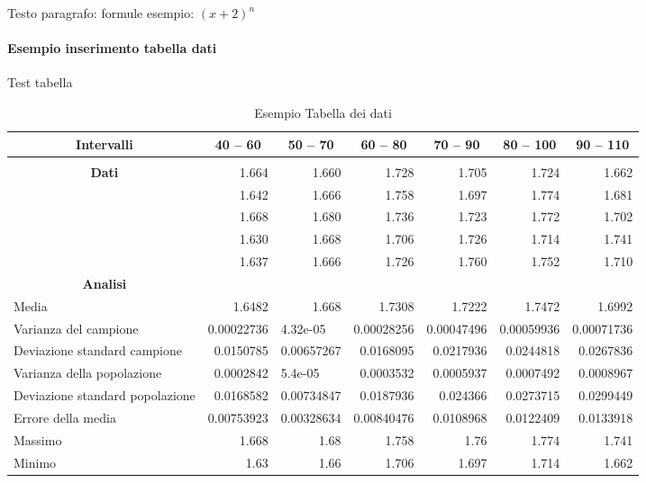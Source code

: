 \documentclass[12pt]{article} %
\begin{document}
	Testo paragrafo: formule %
	esempio: \((x+2)^n\)


\paragraph{Esempio inserimento tabella dati}
Test tabella
\begin{table}[!ht]
	\small
	\centering
	\caption{Esempio Tabella dei dati}
	\begin{tabular}{|l|r|r|r|r|r|r|}
		\hline
		\multicolumn{1}{|c|}{\textbf{Intervalli}} & \multicolumn{1}{c|}{40 – 60} & \multicolumn{1}{c|}{50 – 70} & \multicolumn{1}{c|}{60 – 80} & \multicolumn{1}{c|}{70 – 90} & \multicolumn{1}{c|}{80 – 100} & \multicolumn{1}{c|}{90 – 110} \\ \hline
		 & \multicolumn{ 6}{c|}{} \\ \hline
		\multicolumn{ 1}{|c|}{\textbf{Dati}} & 1.664 & 1.660 & 1.728 & 1.705 & 1.724 & 1.662 \\ \cline{ 2- 7}
		\multicolumn{ 1}{|l|}{} & 1.642 & 1.666 & 1.758 & 1.697 & 1.774 & 1.681 \\ \cline{ 2- 7}
		\multicolumn{ 1}{|l|}{} & 1.668 & 1.680 & 1.736 & 1.723 & 1.772 & 1.702 \\ \cline{ 2- 7}
		\multicolumn{ 1}{|l|}{} & 1.630 & 1.668 & 1.706 & 1.726 & 1.714 & 1.741 \\ \cline{ 2- 7}
		\multicolumn{ 1}{|l|}{} & 1.637 & 1.666 & 1.726 & 1.760 & 1.752 & 1.710 \\ \hline
		\multicolumn{1}{|c|}{\textbf{Analisi}} & \multicolumn{1}{l|}{} & \multicolumn{1}{l|}{} & \multicolumn{1}{l|}{} & \multicolumn{1}{l|}{} & \multicolumn{1}{l|}{} & \multicolumn{1}{l|}{} \\ \hline
		Media & 1.6482 & 1.668 & 1.7308 & 1.7222 & 1.7472 & 1.6992 \\ \hline
		Varianza del campione & 0.00022736 & \multicolumn{1}{l|}{4.32e-05} & 0.00028256 & 0.00047496 & 0.00059936 & 0.00071736 \\ \hline
		Deviazione standard campione & 0.0150785 & 0.00657267 & 0.0168095 & 0.0217936 & 0.0244818 & 0.0267836 \\ \hline
		Varianza della popolazione & 0.0002842 & \multicolumn{1}{l|}{        5.4e-05} & 0.0003532 & 0.0005937 & 0.0007492 & 0.0008967 \\ \hline
		Deviazione standard popolazione & 0.0168582 & 0.00734847 & 0.0187936 & 0.024366 & 0.0273715 & 0.0299449 \\ \hline
		Errore della media & 0.00753923 & 0.00328634 & 0.00840476 & 0.0108968 & 0.0122409 & 0.0133918 \\ \hline
		Massimo & 1.668 & 1.68 & 1.758 & 1.76 & 1.774 & 1.741 \\ \hline
		Minimo & 1.63 & 1.66 & 1.706 & 1.697 & 1.714 & 1.662 \\ \hline
	\end{tabular}
	\label{}
\end{table}
\end{document}
